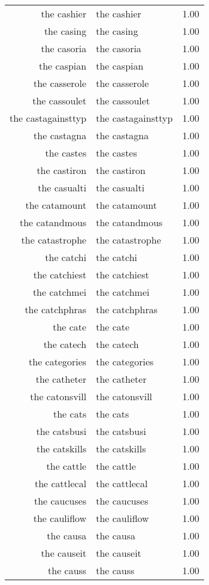\begin{table}[ht]
\begin{tabular}{rlr}
  the cashier & the cashier & 1.00 \\ 
  the casing & the casing & 1.00 \\ 
  the casoria & the casoria & 1.00 \\ 
  the caspian & the caspian & 1.00 \\ 
  the casserole & the casserole & 1.00 \\ 
  the cassoulet & the cassoulet & 1.00 \\ 
  the castagainsttyp & the castagainsttyp & 1.00 \\ 
  the castagna & the castagna & 1.00 \\ 
  the castes & the castes & 1.00 \\ 
  the castiron & the castiron & 1.00 \\ 
  the casualti & the casualti & 1.00 \\ 
  the catamount & the catamount & 1.00 \\ 
  the catandmous & the catandmous & 1.00 \\ 
  the catastrophe & the catastrophe & 1.00 \\ 
  the catchi & the catchi & 1.00 \\ 
  the catchiest & the catchiest & 1.00 \\ 
  the catchmei & the catchmei & 1.00 \\ 
  the catchphras & the catchphras & 1.00 \\ 
  the cate & the cate & 1.00 \\ 
  the catech & the catech & 1.00 \\ 
  the categories & the categories & 1.00 \\ 
  the catheter & the catheter & 1.00 \\ 
  the catonsvill & the catonsvill & 1.00 \\ 
  the cats & the cats & 1.00 \\ 
  the catsbusi & the catsbusi & 1.00 \\ 
  the catskills & the catskills & 1.00 \\ 
  the cattle & the cattle & 1.00 \\ 
  the cattlecal & the cattlecal & 1.00 \\ 
  the caucuses & the caucuses & 1.00 \\ 
  the cauliflow & the cauliflow & 1.00 \\ 
  the causa & the causa & 1.00 \\ 
  the causeit & the causeit & 1.00 \\ 
  the causs & the causs & 1.00 \\ 

\end{tabular}
\end{table}
